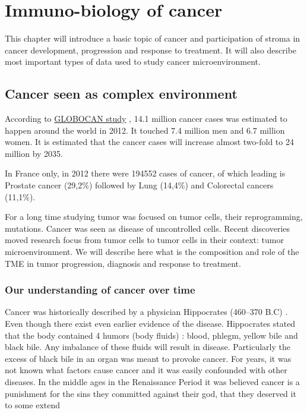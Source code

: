 \documentclass[12pt,]{book}
\theoremstyle{definition}
\theoremstyle{definition}
\theoremstyle{definition}
\theoremstyle{remark}
\begin{document}
{
\setcounter{tocdepth}{4}
\tableofcontents
}
\listoftables
\listoffigures
\hypertarget{intro}{%
\chapter{Immuno-biology of cancer}\label{intro}}

\setcounter{page}{11}

This chapter will introduce a basic topic of cancer and participation of
stroma in cancer development, progression and response to treatment. It
will also describe most important types of data used to study cancer
microenvironment.

\hypertarget{cancer-seen-as-complex-environment}{%
\section{Cancer seen as complex
environment}\label{cancer-seen-as-complex-environment}}

According to
\href{http://globocan.iarc.fr/Pages/fact_sheets_cancer.aspx}{GLOBOCAN
study} \citep{GLOBOCAN}, 14.1 million cancer cases was estimated to
happen around the world in 2012. It touched 7.4 million men and 6.7
million women. It is estimated that the cancer cases will increase
almost two-fold to 24 million by 2035.

In France only, in 2012 there were 194552 cases of cancer, of which
leading is Prostate cancer (29,2\%) followed by Lung (14,4\%) and
Colorectal cancers (11,1\%).

For a long time studying tumor was focused on tumor cells, their
reprogramming, mutations. Cancer was seen as disease of uncontrolled
cells. Recent discoveries moved research focus from tumor cells to tumor
cells in their context: tumor microenvironment. We will describe here
what is the composition and role of the TME in tumor progression,
diagnosis and response to treatment.

\hypertarget{our-understanding-of-cancer-over-time}{%
\subsection{Our understanding of cancer over
time}\label{our-understanding-of-cancer-over-time}}

Cancer was historically described by a physician Hippocrates (460--370
B.C) \citep{Sudhakar2009}. Even though there exist even earlier evidence
of the disease. Hippocrates stated that the body contained 4 humors
(body fluids) : blood, phlegm, yellow bile and black bile. Any imbalance
of these fluids will result in disease. Particularly the excess of black
bile in an organ was meant to provoke cancer. For years, it was not
known what factors cause cancer and it was easily confounded with other
diseases. In the middle ages in the Renaissance Period it was believed
cancer is a punishment for the sins they committed against their god,
that they deserved it to some extend
\end{document}

